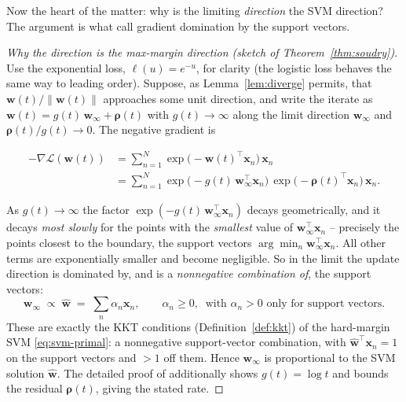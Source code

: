 Now the heart of the matter: why is the limiting \emph{direction} the SVM
direction? The argument is what \citet{soudry2018} call gradient
domination by the support vectors.

\begin{proof}[Why the direction is the max-margin direction (sketch of
Theorem~\ref{thm:soudry})]
Use the exponential loss, $\ell(u)=e^{-u}$, for clarity (the logistic
loss behaves the same way to leading order). Suppose, as
Lemma~\ref{lem:diverge}
permits, that $\mathbf{w}(t)/\|\mathbf{w}(t)\|$ approaches some unit
direction, and write the iterate as $\mathbf{w}(t) = g(t)\,\mathbf{w}_\infty
+ \boldsymbol{\rho}(t)$ with $g(t)\to\infty$ along the limit direction
$\mathbf{w}_\infty$ and $\boldsymbol\rho(t)/g(t)\to 0$. The negative
gradient is

\begin{align*}
  -\nabla\mathcal{L}(\mathbf{w}(t))
  &= \sum_{n=1}^N \exp\!\big(-\mathbf{w}(t)^\top\mathbf{x}_n\big)\,\mathbf{x}_n \\
  &= \sum_{n=1}^N \exp\!\big(-g(t)\,\mathbf{w}_\infty^\top\mathbf{x}_n\big)\,
     \exp\!\big(-\boldsymbol\rho(t)^\top\mathbf{x}_n\big)\,\mathbf{x}_n.
\end{align*}

As $g(t)\to\infty$ the factor $\exp(-g(t)\,\mathbf{w}_\infty^\top
\mathbf{x}_n)$ decays geometrically, and it decays \emph{most slowly} for
the points with the \emph{smallest} value of $\mathbf{w}_\infty^\top
\mathbf{x}_n$ -- precisely the points closest to the boundary, the support
vectors $\arg\min_n \mathbf{w}_\infty^\top\mathbf{x}_n$. All other terms
are exponentially smaller and become negligible. So in the limit the
update direction is dominated by, and is a \emph{nonnegative combination
of}, the support vectors:
\[
  \mathbf{w}_\infty \;\propto\; \widehat{\mathbf{w}}
  \;=\; \sum_{n} \alpha_n \mathbf{x}_n,\qquad
  \alpha_n\ge 0, \ \text{ with } \alpha_n>0 \text{ only for support vectors.}
\]
These are exactly the KKT conditions (Definition~\ref{def:kkt}) of the
hard-margin SVM \eqref{eq:svm-primal}: a nonnegative support-vector
combination, with $\widehat{\mathbf{w}}^\top\mathbf{x}_n=1$ on the
support vectors and $>1$ off them. Hence $\mathbf{w}_\infty$ is
proportional to the SVM solution $\widehat{\mathbf{w}}$. The detailed
proof of \citet{soudry2018} additionally shows $g(t)=\log t$ and bounds
the residual $\boldsymbol\rho(t)$, giving the stated rate.
\end{proof}

